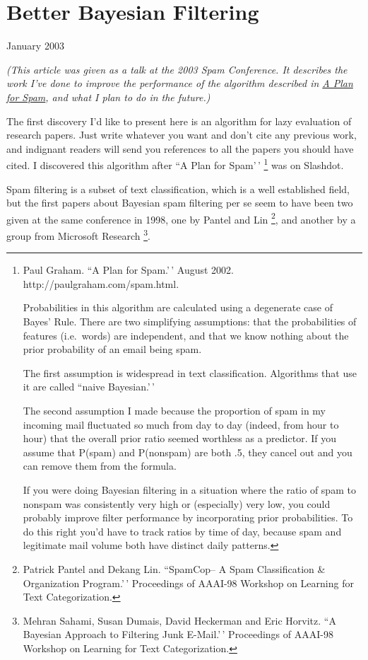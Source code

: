 \chapter{Better Bayesian Filtering}

January 2003

\emph{(This article was given as a talk at the 2003 Spam Conference. It
describes the work I've done to improve the performance of the algorithm
described in \href{spam.html}{A Plan for Spam}, and what I plan to do in
the future.)}

The first discovery I'd like to present here is an algorithm for lazy
evaluation of research papers. Just write whatever you want and don't
cite any previous work, and indignant readers will send you references
to all the papers you should have cited. I discovered this algorithm
after ``A Plan for Spam'\,' \footnote{Paul Graham. ``A Plan for Spam.'\,' August 2002.
http://paulgraham.com/spam.html.

Probabilities in this algorithm are calculated using a degenerate case
of Bayes' Rule. There are two simplifying assumptions: that the
probabilities of features (i.e.~words) are independent, and that we know
nothing about the prior probability of an email being spam.

The first assumption is widespread in text classification. Algorithms
that use it are called ``naive Bayesian.'\,'

The second assumption I made because the proportion of spam in my
incoming mail fluctuated so much from day to day (indeed, from hour to
hour) that the overall prior ratio seemed worthless as a predictor. If
you assume that P(spam) and P(nonspam) are both .5, they cancel out and
you can remove them from the formula.

If you were doing Bayesian filtering in a situation where the ratio of
spam to nonspam was consistently very high or (especially) very low, you
could probably improve filter performance by incorporating prior
probabilities. To do this right you'd have to track ratios by time of
day, because spam and legitimate mail volume both have distinct daily
patterns.} was on Slashdot.

Spam filtering is a subset of text classification, which is a well
established field, but the first papers about Bayesian spam filtering
per se seem to have been two given at the same conference in 1998, one
by Pantel and Lin \footnote{Patrick Pantel and Dekang Lin. ``SpamCop-- A Spam Classification
\& Organization Program.'\,' Proceedings of AAAI-98 Workshop on Learning
for Text Categorization.}, and another by a group from Microsoft
Research \footnote{Mehran Sahami, Susan Dumais, David Heckerman and Eric Horvitz.
``A Bayesian Approach to Filtering Junk E-Mail.'\,' Proceedings of
AAAI-98 Workshop on Learning for Text Categorization.}.

